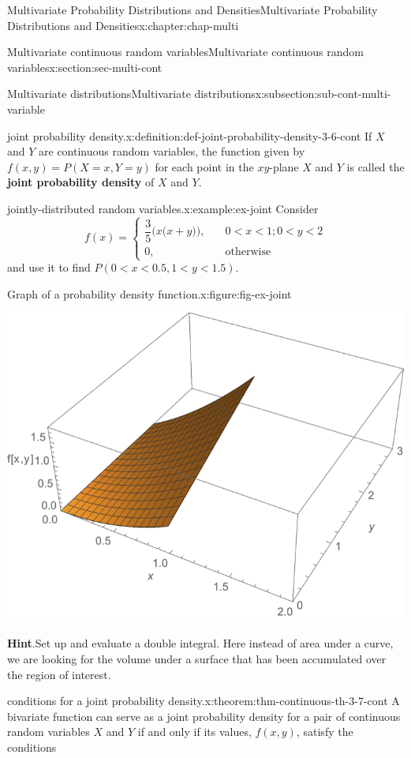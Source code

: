 \documentclass[oneside,10pt,]{book}
\newcommand{\blocktitlefont}{\relax}
\newcommand{\terminology}[1]{\textbf{#1}}
\numberwithin{equation}{section}
\newcommand{\lt}{<}
\newcommand{\amp}{&}
\begin{document}
\begin{chapterptx}{Multivariate Probability Distributions and Densities}{}{Multivariate Probability Distributions and Densities}{}{}{x:chapter:chap-multi}
\begin{sectionptx}{Multivariate continuous random variables}{}{Multivariate continuous random variables}{}{}{x:section:sec-multi-cont}
\begin{subsectionptx}{Multivariate distributions}{}{Multivariate distributions}{}{}{x:subsection:sub-cont-multi-variable}
\begin{definition}{joint probability density.}{x:definition:def-joint-probability-density-3-6-cont}
If \(X\) and \(Y\) are continuous random variables, the function given by \(f(x,y) = P(X=x, Y=y)\) for each point in the \(xy\)-plane \(X\) and \(Y\) is called the \terminology{joint probability density} of \(X\) and \(Y\).%
\end{definition}
\begin{example}{jointly-distributed random variables.}{x:example:ex-joint}%
Consider%
\begin{equation*}
f(x) = \begin{cases}\dfrac{3}{5}\Big(x\Big(x+y\Big)\Big),\amp \quad 0 \lt x \lt 1; 0 \lt y \lt 2\\
0,\amp \quad \text{otherwise}\end{cases}
\end{equation*}
and use it to find \(P(0 \lt x \lt 0.5, 1 \lt y \lt 1.5)\).%
\begin{figureptx}{Graph of a probability density function.}{x:figure:fig-ex-joint}{}%
\begin{image}{0.25}{0.5}{0.25}%
\includegraphics[width=\linewidth]{./images/little_f.png}
\end{image}%
\tcblower
\end{figureptx}%
\textbf{\blocktitlefont Hint}.\quad{}Set up and evaluate a double integral. Here instead of area under a curve, we are looking for the volume under a surface that has been accumulated over the region of interest.%
\end{example}
\begin{theorem}{conditions for a joint probability density.}{}{x:theorem:thm-continuous-th-3-7-cont}%
A bivariate function can serve as a joint probability density for a pair of continuous random variables \(X\) and \(Y\) if and only if its values, \(f(x, y)\), satisfy the conditions%

\end{theorem}
\end{subsectionptx}
\end{sectionptx}
\end{chapterptx}
\end{document}
